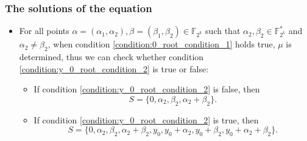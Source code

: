 \documentclass[
    aspectratio=169,                   %
]{beamer}
\newcommand{\Fks}{\mathbb{F}_{2^k}^*}
\newcommand{\Fk}{\mathbb{F}_{2^k}}
\begin{document}
    \begin{frame}
        \frametitle{The solutions of the equation}
        
        \begin{itemize}
            \item For all points $ \alpha=(\alpha_1,\alpha_2),\beta=(\beta_1,\beta_2)\in\Fk $ such that $ \alpha_2,\beta_2\in\Fks $ 
            and $ \alpha_2\ne\beta_2 $,
            when condition \eqref{condition:0_root_condition_1} holds true, $ \mu $ is determined, thus we can check whether 
            condition \eqref{condition:y_0_root_condition_2} is true or false: 
            \begin{itemize}
                \item[\ding{110}] If condition \eqref{condition:y_0_root_condition_2} is false, then 
                \[S = \{0,\alpha_2,\beta_2,\alpha_2+\beta_2\}.\] 
                \item[\ding{110}] If condition \eqref{condition:y_0_root_condition_2} is true, then 
                \[S = \{0,\alpha_2,\beta_2,\alpha_2+\beta_2,y_0,y_0+\alpha_2,y_0+\beta_2,y_0+\alpha_2+\beta_2\}.\] 
            \end{itemize}
        \end{itemize}
    \end{frame}
\end{document}
